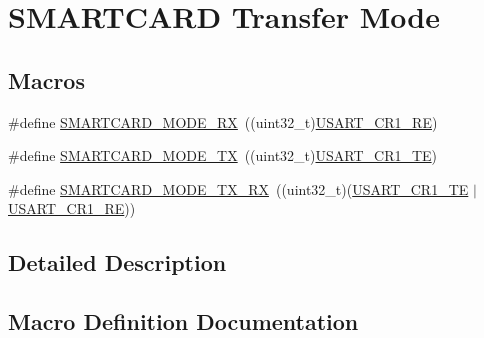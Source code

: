 \hypertarget{group___s_m_a_r_t_c_a_r_d___mode}{}\section{S\+M\+A\+R\+T\+C\+A\+RD Transfer Mode}
\label{group___s_m_a_r_t_c_a_r_d___mode}
\subsection*{Macros}
\begin{DoxyCompactItemize}
\item 
\#define \hyperlink{group___s_m_a_r_t_c_a_r_d___mode_ga88cae88197abe0d85a82c6335454ab84}{S\+M\+A\+R\+T\+C\+A\+R\+D\+\_\+\+M\+O\+D\+E\+\_\+\+RX}~((uint32\+\_\+t)\hyperlink{group___peripheral___registers___bits___definition_gada0d5d407a22264de847bc1b40a17aeb}{U\+S\+A\+R\+T\+\_\+\+C\+R1\+\_\+\+RE})
\item 
\#define \hyperlink{group___s_m_a_r_t_c_a_r_d___mode_ga32859d392982097d1c2c95cd7332bcf7}{S\+M\+A\+R\+T\+C\+A\+R\+D\+\_\+\+M\+O\+D\+E\+\_\+\+TX}~((uint32\+\_\+t)\hyperlink{group___peripheral___registers___bits___definition_gade7f090b04fd78b755b43357ecaa9622}{U\+S\+A\+R\+T\+\_\+\+C\+R1\+\_\+\+TE})
\item 
\#define \hyperlink{group___s_m_a_r_t_c_a_r_d___mode_gac481921bcb3a053264f1ddc92164bda6}{S\+M\+A\+R\+T\+C\+A\+R\+D\+\_\+\+M\+O\+D\+E\+\_\+\+T\+X\+\_\+\+RX}~((uint32\+\_\+t)(\hyperlink{group___peripheral___registers___bits___definition_gade7f090b04fd78b755b43357ecaa9622}{U\+S\+A\+R\+T\+\_\+\+C\+R1\+\_\+\+TE} $\vert$\hyperlink{group___peripheral___registers___bits___definition_gada0d5d407a22264de847bc1b40a17aeb}{U\+S\+A\+R\+T\+\_\+\+C\+R1\+\_\+\+RE}))
\end{DoxyCompactItemize}


\subsection{Detailed Description}


\subsection{Macro Definition Documentation}
\mbox{\label{group___s_m_a_r_t_c_a_r_d___mode_ga88cae88197abe0d85a82c6335454ab84}} 
